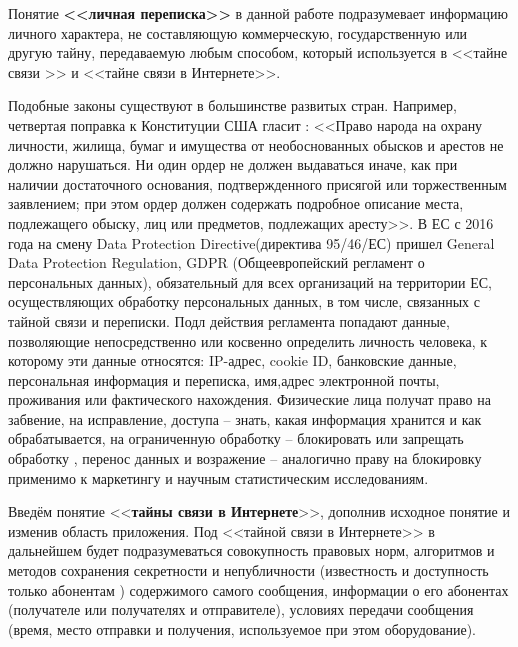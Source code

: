 Понятие \textbf{<<личная переписка>>} в данной работе  подразумевает информацию личного характера, не составляющую коммерческую, государственную или другую тайну, передаваемую любым способом,  который  используется   в <<тайне связи >> и <<тайне связи в Интернете>>.

Подобные законы существуют в большинстве развитых стран. Например, четвертая поправка  к Конституции США  гласит : <<Право народа на охрану личности, жилища, бумаг и имущества от необоснованных обысков и арестов не должно нарушаться. Ни один ордер не должен выдаваться иначе, как при наличии достаточного основания, подтвержденного присягой или торжественным заявлением; при этом ордер должен содержать подробное описание места, подлежащего обыску, лиц или предметов, подлежащих аресту>>.%
В ЕС  с 2016 года  на смену Data Protection Directive(директива 95/46/ЕС) пришел General Data Protection Regulation, GDPR (Общеевропейский регламент о персональных данных), обязательный для всех организаций на территории ЕС, осуществляющих  обработку персональных данных, в том числе, связанных с тайной связи и переписки.   Подл действия регламента попадают данные, позволяющие непосредственно или косвенно определить личность человека, к которому эти данные относятся: IP-адрес, cookie ID, банковские данные, персональная информация и переписка, имя,адрес электронной почты, проживания или фактического нахождения. Физические лица получат право на забвение, на исправление, доступа -- знать, какая информация хранится и как обрабатывается, на ограниченную обработку -- блокировать или запрещать обработку , перенос данных и возражение -- аналогично праву на блокировку применимо к маркетингу и научным статистическим исследованиям.   


Введём понятие <<\textbf{тайны связи в Интернете}>>, дополнив исходное понятие и изменив область приложения. Под <<тайной связи в Интернете>> в дальнейшем будет подразумеваться совокупность правовых норм, алгоритмов и методов сохранения секретности и  непубличности (известность и доступность только абонентам ) содержимого самого сообщения, информации о его абонентах (получателе или получателях и отправителе), условиях передачи сообщения (время, место отправки и получения, используемое при этом оборудование). 

